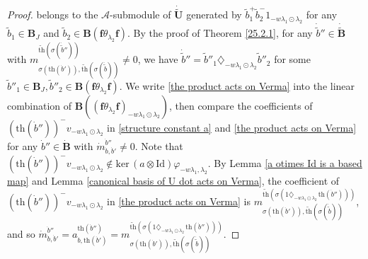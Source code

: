 \documentclass[10pt,a4paper]{amsart}
\begin{document}
\begin{proof}
belongs to the $\mathcal{A}$-submodule of $\dot{\tilde{\mathbf{U}}}$ generated by $\tilde{b}_1^+\tilde{b}_2^-1_{-w\lambda_1\odot\lambda_2}$ for any $\tilde{b}_1\in \mathbf{B}_J$ and $\tilde{b}_2\in \mathbf{B}(\mathbf{f}\theta_{\lambda_2}\mathbf{f})$. By the proof of Theorem \ref{25.2.1}, for any $\dot{\tilde{b}}''\in \dot{\tilde{\mathbf{B}}}$ with $m_{\sigma(\mathrm{th}(\dot{b}')),\widetilde{\mathrm{th}}(\sigma(\dot{\tilde{b}}))}^{\widetilde{\mathrm{th}}(\sigma(\dot{\tilde{b}}''))}\not=0$, we have $\dot{\tilde{b}}''=\tilde{b}''_1\diamondsuit_{-w\lambda_1\odot\lambda_2}\tilde{b}''_2$ for some $\tilde{b}''_1\in \mathbf{B}_J,\tilde{b}''_2\in \mathbf{B}(\mathbf{f}\theta_{\lambda_2}\mathbf{f})$. We write \eqref{the product acts on Verma} into the linear combination of $\mathbf{B}((\mathbf{f}\theta_{\lambda_2}\mathbf{f})_{-w\lambda_1\odot\lambda_2})$, then compare the coefficients of $(\mathrm{th}(\dot{b}''))^-v_{-w\lambda_1\odot\lambda_2}$ in \eqref{structure constant a} and \eqref{the product acts on Verma} for any $\dot{b}'' \in \dot{\mathbf{B}}$ with $\dot{m}_{\dot{b},\dot{b}'}^{\dot{b}''}\not=0$. Note that $(\mathrm{th}(\dot{b}''))^-v_{-w\lambda_1\odot\lambda_2}\notin \mathrm{ker}\,(a\otimes \mathrm{Id})\varphi_{-w\lambda_1,\lambda_2}$. 
By Lemma \ref{a otimes Id is a based map} and Lemma \ref{canonical basis of U dot acts on Verma}, the coefficient of $(\mathrm{th}(\dot{b}''))^-v_{-w\lambda_1\odot\lambda_2}$ in \eqref{the product acts on Verma} is $m_{\sigma(\mathrm{th}(\dot{b}')),\widetilde{\mathrm{th}}(\sigma(\dot{\tilde{b}}))}^{\widetilde{\mathrm{th}}(\sigma(1\diamondsuit_{-w\lambda_1\odot\lambda_2}\,\mathrm{th}(\dot{b}'')))}$, and so $\dot{m}_{\dot{b},\dot{b}'}^{\dot{b}''}=a_{\dot{b},\mathrm{th}(\dot{b}')}^{\mathrm{th}(\dot{b}'')}=m_{\sigma(\mathrm{th}(\dot{b}')),\widetilde{\mathrm{th}}(\sigma(\dot{\tilde{b}}))}^{\widetilde{\mathrm{th}}(\sigma(1\diamondsuit_{-w\lambda_1\odot\lambda_2}\,\mathrm{th}(\dot{b}'')))}$. 
\end{proof}
\end{document}

